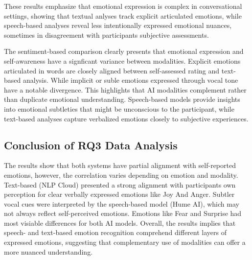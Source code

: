 These results emphasize that emotional expression is complex in conversational settings, showing that textual anlyses track explicit articulated emotions, 
while speech-based analyses reveal less intentionally expressed emotional nuances, sometimes in disagreement with participants subjective assessments. 

The sentiment-based comparison clearly presents that emotional expression and self-awareness have a signficant variance between modalities. Explicit emotions articulated in words are closely aligned between self-assessed rating and text-based analysis. 
While implicit or suble emotions expressed through vocal tone have a notable divergence. This highlights that AI modalities complement rather than duplicate emotional understanding. 
Speech-based models provide insights into emotional subtleties that might be unconscious to the participant, while text-based analyses capture verbalized emotions closely to subjective experiences. 


\subsection{Conclusion of RQ3 Data Analysis}
The results show that both systems have partial alignment with self-reported emotions, however, the correlation varies depending on emotion and modality. 
Text-based (NLP Cloud) presented a strong alignment with participants own perception for clear verbally expressed emotions like Joy And Anger. Subtler vocal cues were interpreted by the speech-based 
model (Hume AI), which may not always reflect self-perceived emotions. Emotions like Fear and Surprise had most visiable differences for both AI models. 
Overall, the results implies that speech- and text-based emotion recognition comprehend different layers of expressed emotions, suggesting that complementary use of modalities can offer a more nuanced understanding.  